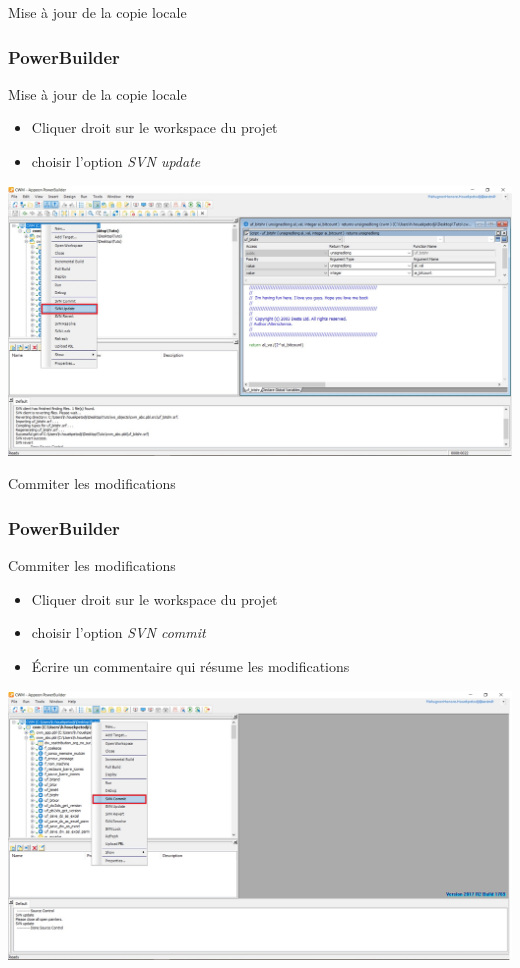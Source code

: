 \documentclass{beamer}
\begin{document}
\begin{frame}
\begin{center}
\huge{Mise à jour de la copie locale}
\end{center}
\end{frame}

\begin{frame}
\frametitle{PowerBuilder}
\begin{block}{Mise à jour de la copie locale}
\begin{itemize}
\item Cliquer droit sur le workspace du projet
\item choisir l'option \alert{\textit{SVN update}}
\end{itemize}
\end{block}
\includegraphics[scale=0.25]{../images/svnupdate.jpg}
\end{frame}

\begin{frame}
\begin{center}
\huge{Commiter les modifications}
\end{center}
\end{frame}

\begin{frame}
\frametitle{PowerBuilder}
\begin{block}{ Commiter les modifications}
\begin{itemize}
\item Cliquer droit sur le workspace du projet
\item choisir l'option \alert{\textit{SVN commit}}
\item Écrire un commentaire qui résume les modifications
\end{itemize} 
\end{block}
\includegraphics[scale=0.25]{../images/commit1.jpg}
\end{frame}
\end{document}
